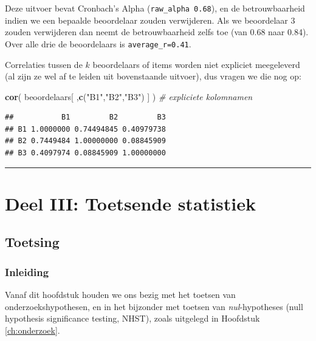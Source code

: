 \documentclass[
]{book}
\newenvironment{Shaded}{\begin{snugshade}}{\end{snugshade}}
\newcommand{\CommentTok}[1]{\textcolor[rgb]{0.56,0.35,0.01}{\textit{#1}}}
\newcommand{\KeywordTok}[1]{\textcolor[rgb]{0.13,0.29,0.53}{\textbf{#1}}}
\newcommand{\NormalTok}[1]{#1}
\newcommand{\StringTok}[1]{\textcolor[rgb]{0.31,0.60,0.02}{#1}}
\begin{document}
Deze uitvoer bevat Cronbach's Alpha (\texttt{raw\_alpha\ 0.68}), en de
betrouwbaarheid indien we een bepaalde beoordelaar zouden verwijderen.
Als we beoordelaar 3 zouden verwijderen dan neemt de betrouwbaarheid
zelfs toe (van 0.68 naar 0.84). Over alle drie de beoordelaars is
\texttt{average\_r=0.41}.

Correlaties tussen de \(k\) beoordelaars of items worden niet expliciet
meegeleverd (al zijn ze wel af te leiden uit bovenstaande uitvoer), dus
vragen we die nog op:

\begin{Shaded}
\begin{Highlighting}[]
\KeywordTok{cor}\NormalTok{( beoordelaars[ ,}\KeywordTok{c}\NormalTok{(}\StringTok{"B1"}\NormalTok{,}\StringTok{"B2"}\NormalTok{,}\StringTok{"B3"}\NormalTok{) ] ) }\CommentTok{\# expliciete kolomnamen}
\end{Highlighting}
\end{Shaded}

\begin{verbatim}
##           B1         B2         B3
## B1 1.0000000 0.74494845 0.40979738
## B2 0.7449484 1.00000000 0.08845909
## B3 0.4097974 0.08845909 1.00000000
\end{verbatim}

\begin{center}\rule{0.5\linewidth}{0.5pt}\end{center}

\hypertarget{part-deel-iii-toetsende-statistiek}{%
\part*{Deel III: Toetsende statistiek}\label{part-deel-iii-toetsende-statistiek}}

\hypertarget{ch:toetsing}{%
\chapter{Toetsing}\label{ch:toetsing}}

\hypertarget{sec:toetsing-inleiding}{%
\section{Inleiding}\label{sec:toetsing-inleiding}}

Vanaf dit hoofdstuk houden we ons bezig met het toetsen van
onderzoekshypothesen, en in het bijzonder met toetsen van \emph{nul}-hypotheses (null hypothesis significance testing, NHST), zoals uitgelegd in Hoofdstuk \ref{ch:onderzoek}.
\end{document}
